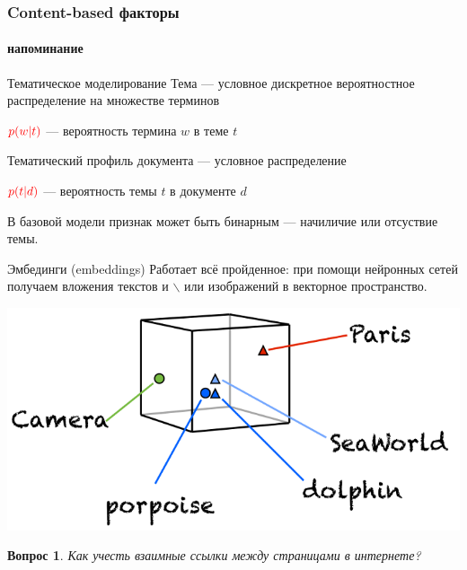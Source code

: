 \documentclass[fullscreen=true, bookmarks=true, hyperref={pdfencoding=unicode}]{beamer}
\newtheorem*{question}{Вопрос}
\begin{document}
\begin{frame}
  \frametitle{Content-based факторы}
  \framesubtitle{напоминание}

  \begin{block}{Тематическое моделирование}
    Тема — условное дискретное вероятностное распределение на множестве терминов

    $\color{red}{p(w | t)}$ — вероятность термина $w$ в теме $t$

    Тематический профиль документа — условное распределение

    $\color{red}{p(t | d)}$ — вероятность темы $t$ в документе $d$

    В базовой модели признак может быть бинарным — начиличие или отсуствие темы.
  \end{block}
\end{frame}


\begin{frame}
  \begin{block}{Эмбединги (embeddings)}
    Работает всё пройденное: при помощи нейронных сетей получаем вложения текстов и $\backslash$ или изображений в векторное пространство.
  \end{block}

  \begin{center}
    \includegraphics[keepaspectratio,
                     width=.5\paperwidth]{embedding.png}
  \end{center}
  \pause
  \begin{question}
    Как учесть взаимные ссылки между страницами в интернете?
  \end{question}
\end{frame}
\end{document}

